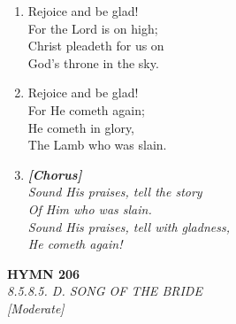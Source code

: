 \documentclass[11pt,a4paper]{article}
\begin{document}
\begin{enumerate}
    \item Rejoice and be glad! \\
        For the Lord is on high; \\
        Christ pleadeth for us on \\
        God's throne in the sky.

    \item Rejoice and be glad! \\
        For He cometh again; \\
        He cometh in glory, \\
        The Lamb who was slain.

    \item[] \vspace{0.4em}
    \textbf{\textit{[Chorus]}} \\
    \textit{Sound His praises, tell the story} \\
    \textit{    Of Him who was slain.} \\
    \textit{Sound His praises, tell with gladness,} \\
    \textit{    He cometh again!}
    \vspace{0.4em}

\end{enumerate}

\newpage
\begin{center}
    {\Large \textbf{HYMN 206}}
    \\
    \textit{8.5.8.5. D. SONG OF THE BRIDE}
    \\
    \textit{\small [Moderate]}
\end{center}
\vspace{1em}
\end{document}
